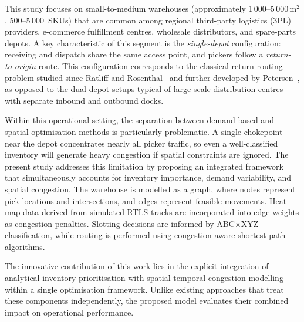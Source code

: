 \documentclass[12pt,a4paper]{article}
\begin{document}
This study focuses on small-to-medium warehouses (approximately 1\,000--5\,000\,m$^2$,
500--5\,000~SKUs) that are common among regional third-party logistics (3PL) providers,
e-commerce fulfillment centres, wholesale distributors, and spare-parts depots. A key
characteristic of this segment is the \emph{single-depot} configuration: receiving and
dispatch share the same access point, and pickers follow a \emph{return-to-origin} route.
This configuration corresponds to the classical return routing problem studied since
Ratliff and Rosenthal~\cite{ref_ratliff} and further developed by
Petersen~\cite{ref_petersen}, as opposed to the dual-depot setups typical of
large-scale distribution centres with separate inbound and outbound docks.

Within this operational setting, the separation between demand-based and spatial
optimisation methods is particularly problematic. A single chokepoint near the depot
concentrates nearly all picker traffic, so even a well-classified inventory will generate
heavy congestion if spatial constraints are ignored. The present study addresses this
limitation by proposing an integrated framework that
simultaneously accounts for inventory importance, demand variability, and spatial congestion.
The warehouse is modelled as a graph, where nodes represent pick locations and
intersections, and edges represent feasible movements. Heat map data derived from simulated
RTLS tracks are incorporated into edge weights as congestion penalties. Slotting decisions
are informed by ABC$\times$XYZ classification, while routing is performed using
congestion-aware shortest-path algorithms.

The innovative contribution of this work lies in the explicit integration of analytical inventory
prioritisation with spatial-temporal congestion modelling within a single optimisation
framework. Unlike existing approaches that treat these components independently, the
proposed model evaluates their combined impact on operational performance.
\end{document}
